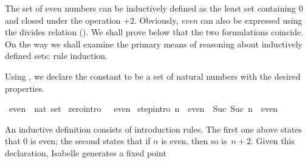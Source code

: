 %
\begin{isabellebody}%
\def\isabellecontext{Even}%
%
\isadelimtheory
%
\endisadelimtheory
%
\isatagtheory
%
\endisatagtheory
{\isafoldtheory}%
%
\isadelimtheory
%
\endisadelimtheory
%
\isamarkuptrue%
%
\begin{isamarkuptext}%
%
The set of even numbers can be inductively defined as the least set
containing 0 and closed under the operation $+2$.  Obviously,
\emph{even} can also be expressed using the divides relation (). 
We shall prove below that the two formulations coincide.  On the way we
shall examine the primary means of reasoning about inductively defined
sets: rule induction.%
\end{isamarkuptext}%
\isamarkuptrue%
%
\isamarkuptrue%
%
\begin{isamarkuptext}%
Using , we declare the constant  to be
a set of natural numbers with the desired properties.%
\end{isamarkuptext}%
\isamarkuptrue%
\isamarkupfalse%
\ even\ {}{}\ {}nat\ set{}\ \isanewline
zero{}intro{}{}{}\ {}{}\ {}\ even{}\ {}\isanewline
step{}intro{}{}{}\ {}n\ {}\ even\ {}\ {}Suc\ {}Suc\ n{}{}\ {}\ even{}%
\begin{isamarkuptext}%
An inductive definition consists of introduction rules.  The first one
above states that 0 is even; the second states that if $n$ is even, then so
is~$n+2$.  Given this declaration, Isabelle generates a fixed point

\end{isamarkuptext}
\end{isabellebody}
